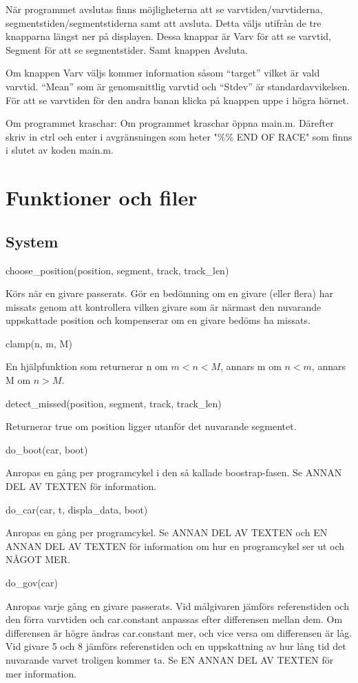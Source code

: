 \documentclass[10pt,oneside,swedish]{lips-no_customer}
\begin{document}
När programmet avslutas finns möjligheterna att se varvtiden/varvtiderna,
segmentstiden/segmentstiderna samt att avsluta. Detta väljs utifrån de tre
knapparna längst ner på displayen. Dessa knappar är Varv för att se varvtid,
Segment för att se segmentstider. Samt knappen Avsluta.

Om knappen Varv väljs kommer information såsom “target” vilket är vald varvtid.
“Mean” som är genomsnittlig varvtid och “Stdev” är standardavvikelsen. För att
se varvtiden för den andra banan klicka på knappen uppe i högra hörnet.

Om programmet kraschar: Om programmet kraschar öppna main.m. Därefter skriv in
ctrl och enter i avgränsningen som heter "\%\% END OF RACE" som finns i slutet av
koden main.m.

\section{Funktioner och filer}

\subsection{System}

choose\_position(position, segment, track, track\_len)

Körs när en givare passerats. Gör en bedömning om en givare (eller flera) har
missats genom att kontrollera vilken givare som är närmast den nuvarande
uppskattade position och kompenserar om en givare bedöms ha missats.

clamp(n, m, M)

En hjälpfunktion som returnerar n om $m < n < M$, annars m om $n < m$, annars M
om $n > M$.

detect\_missed(position, segment, track, track\_len)

Returnerar true om position ligger utanför det nuvarande segmentet.

do\_boot(car, boot)

Anropas en gång per programcykel i den så kallade boostrap-fasen. Se ANNAN DEL
AV TEXTEN för information.

do\_car(car, t, displa\_data, boot)

Anropas en gång per programcykel. Se ANNAN DEL AV TEXTEN och EN ANNAN DEL
AV TEXTEN för information om hur en programcykel ser ut och NÅGOT MER.

do\_gov(car)

Anropas varje gång en givare passerats. Vid målgivaren jämförs referenstiden och
den förra varvtiden och car.constant anpassas efter differensen mellan dem. Om
differensen är högre ändras car.constant mer, och vice versa om differensen är
låg. Vid givare 5 och 8 jämförs referenstiden och en uppskattning av hur lång
tid det nuvarande varvet troligen kommer ta. Se EN ANNAN DEL AV TEXTEN för
mer information.
\end{document}
